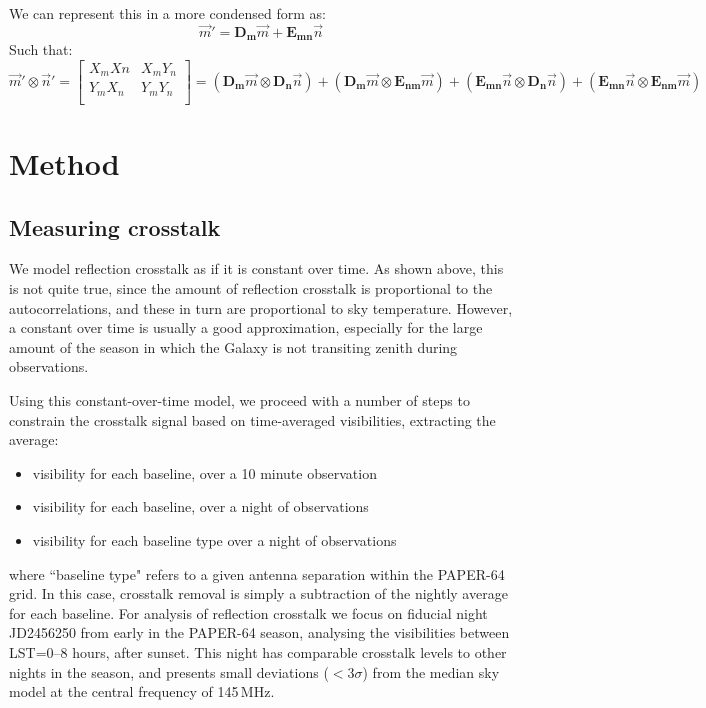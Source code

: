 \documentclass[10pt,a4paper,notitlepage]{article}
\begin{document}
\noindent We can represent this in a more condensed form as:
\begin{equation}
\vec{m}' = \boldsymbol{D_m}\vec{m} + \boldsymbol{E_{mn}}\vec{n}
\end{equation}
\noindent Such that:
\begin{equation}
\vec{m}'\otimes\vec{n}'
=
\begin{bmatrix}
X_mXn & X_mY_n \\
Y_mX_n & Y_mY_n\\
\end{bmatrix}
=
(\boldsymbol{D_m}\vec{m} \otimes \boldsymbol{D_n}\vec{n})
+
(\boldsymbol{D_m}\vec{m} \otimes \boldsymbol{E_{nm}}\vec{m})
+
(\boldsymbol{E_{mn}}\vec{n} \otimes \boldsymbol{D_n}\vec{n})
+
(\boldsymbol{E_{mn}}\vec{n} \otimes \boldsymbol{E_{nm}}\vec{m})
\end{equation}


\section{Method}
\label{sec:method}

\subsection{Measuring crosstalk}
\label{subsec:method_xtalk}
We model reflection crosstalk as if it is constant over time. As shown above, this is not quite true, since the amount of reflection crosstalk is proportional to the autocorrelations, and these in turn are proportional to sky temperature. However, a constant over time is usually a good approximation, especially for the large amount of the season in which the Galaxy is not transiting zenith during observations.

Using this constant-over-time model, we proceed with a number of steps to constrain the crosstalk signal based on time-averaged visibilities, extracting the average:
\begin{itemize}
\item  visibility for each baseline, over a 10 minute observation
\item  visibility for each baseline, over a night of observations
\item  visibility for each baseline type over a night of observations
\end{itemize}
\noindent where ``baseline type" refers to a given antenna separation within the PAPER-64 grid. In this case, crosstalk removal is simply a subtraction of the nightly average for each baseline. For analysis of reflection crosstalk we focus on fiducial night JD2456250 from early in the PAPER-64 season, analysing the visibilities between LST=0--8 hours, after sunset. This night has comparable crosstalk levels to other nights in the season, and presents small deviations ($<3\sigma$) from the median sky model at the central frequency of 145\,MHz. 
\end{document}
